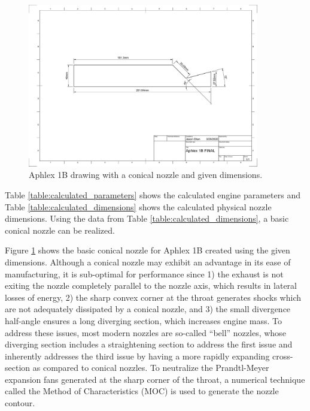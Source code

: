 \documentclass[9pt]{article} %
\numberwithin{equation}{section} %
\begin{document}
\begin{figure}
\centering
\includegraphics[scale=0.5, width=0.9\textwidth, trim={6.5cm 12.5cm 5.5cm 9cm}, clip]{aphlex1b-drawing} %
\caption{Aphlex 1B drawing with a conical nozzle and given dimensions.}
\label{fig:conical_nozzle_drawing}
\end{figure}

Table \ref{table:calculated_parameters} shows the calculated engine parameters and Table \ref{table:calculated_dimensions} shows the calculated physical nozzle dimensions. Using the data from Table \ref{table:calculated_dimensions}, a basic conical nozzle can be realized.

Figure \ref{fig:conical_nozzle_drawing} shows the basic conical nozzle for Aphlex 1B created using the given dimensions. Although a conical nozzle may exhibit an advantage in its ease of manufacturing, it is sub-optimal for performance since 1) the exhaust is not exiting the nozzle completely parallel to the nozzle axis, which results in lateral losses of energy, 2) the sharp convex corner at the throat generates shocks which are not adequately dissipated by a conical nozzle, and 3) the small divergence half-angle ensures a long diverging section, which increases engine mass. To address these issues, most modern nozzles are so-called ``bell'' nozzles, whose diverging section includes a straightening section to address the first issue and inherently addresses the third issue by having a more rapidly expanding cross-section as compared to conical nozzles. To neutralize the Prandtl-Meyer expansion fans generated at the sharp corner of the throat, a numerical technique called the Method of Characteristics (MOC) is used to generate the nozzle contour. 
\end{document}
